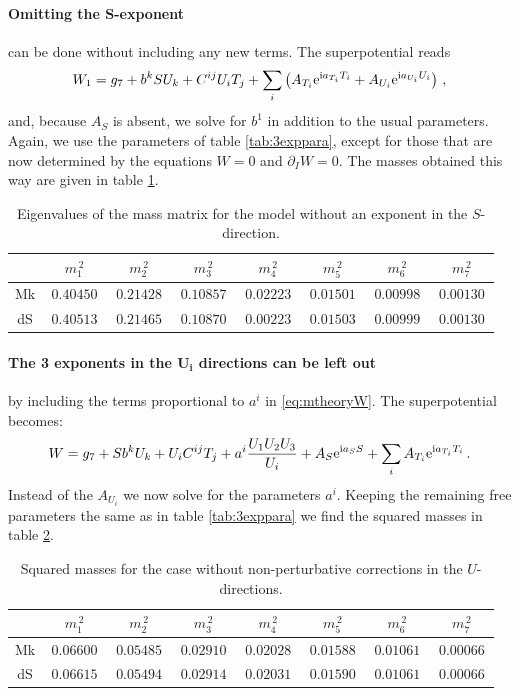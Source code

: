 \documentclass[a4paper,12pt]{report}
\newcommand{\be}{\begin{equation}}
\newcommand{\ee}{\end{equation}}
\def\rmi{{\rm i}}
\def\rme{{\rm e}}
\begin{document}
\FloatBarrier
\paragraph{Omitting the $\mathbf{S}$-exponent} can be done without including any new terms. The superpotential reads
\be 
W_1 = g_7 + b^k S U_k + C^{ij} U_i T_j + \sum_i \left( A_{T_i} \rme^{\rmi a_{T_i}T_i} + A_{U_i} \rme^{\rmi a_{U_i}U_i} \right)\,,
\ee
and, because $A_S$ is absent, we solve for $b^1$ in addition to the usual parameters. Again, we use the parameters of table \ref{tab:3exppara}, except for those that are now determined by the equations $W = 0$ and $\partial_I W = 0$. The masses obtained this way are given in table \ref{tab:noSmass}.
\begin{table}[htb]
\center
\begin{tabular}{|c|c|c|c|c|c|c|c|}\hline
     &$\,m_1^{\,2}\,$&$\,m_2^{\,2}\,$&$\,m_3^{\,2}\,$&$\,m_4^{\,2}\,$&$\,m_5^{\,2}\,$&$\,m_6^{\,2}\,$&$\,m_7^{\,2}\,$\\\hline
Mk & $\, 0.40450 \,$ & $\, 0.21428 \,$ & $\, 0.10857 \,$ & $\, 0.02223 \,$ & $\, 0.01501 \,$ & $\, 0.00998 \,$ & $\, 0.00130 \,$ \\\hline  
dS & $\, 0.40513 \,$ & $\, 0.21465 \,$ & $\, 0.10870 \,$ & $\, 0.00223 \,$ & $\, 0.01503 \,$ & $\, 0.00999 \,$ & $\, 0.00130 \,$ \\\hline  
\end{tabular}
\caption{Eigenvalues of the mass matrix for the model without an exponent in the $S$-direction.}
\label{tab:noSmass}
\end{table}

\FloatBarrier
\paragraph{The 3 exponents in the $\mathbf{U_i}$ directions can be left out} by including the terms proportional to $a^i$ in \eqref{eq:mtheoryW}. The superpotential becomes:
\be
W = g_7 + S b^k U_k + U_i C^{ij} T_j + a^i \frac{U_1 U_2 U_3}{U_i} + A_S \rme^{\rmi a_S S} + \sum_i  A_{T_i} \rme^{\rmi a_{T_i}T_i}\,.
\ee
Instead of the $A_{U_i}$ we now solve for the parameters $a^i$. Keeping the remaining free parameters the same as in table \ref{tab:3exppara} we find the squared masses in table \ref{tab:noUmass}.
\begin{table}[htb]
\center
\begin{tabular}{|c|c|c|c|c|c|c|c|}\hline
     &$\,m_1^{\,2}\,$&$\,m_2^{\,2}\,$&$\,m_3^{\,2}\,$&$\,m_4^{\,2}\,$&$\,m_5^{\,2}\,$&$\,m_6^{\,2}\,$&$\,m_7^{\,2}\,$\\\hline
Mk & $\, 0.06600 \,$ & $\, 0.05485 \,$ & $\, 0.02910 \,$ & $\, 0.02028 \,$ & $\, 0.01588 \,$ & $\, 0.01061 \,$ & $\, 0.00066 \,$ \\\hline  
dS & $\, 0.06615 \,$ & $\, 0.05494 \,$ & $\, 0.02914 \,$ & $\, 0.02031 \,$ & $\, 0.01590 \,$ & $\, 0.01061 \,$ & $\, 0.00066 \,$  \\\hline  
\end{tabular}
\caption{Squared masses for the case without non-perturbative corrections in the $U$-directions.}
\label{tab:noUmass}
\end{table}
\end{document}

